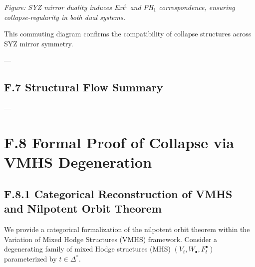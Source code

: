\documentclass[11pt]{article}
\begin{document}
\vspace{0.5em}
\noindent
\begin{minipage}{\textwidth}
\centering
{}
\vspace{0.5em}

\small\textit{Figure: SYZ mirror duality induces Ext$^1$ and PH$_1$ correspondence, ensuring collapse-regularity in both dual systems.}
\end{minipage}

This commuting diagram confirms the compatibility of collapse structures across SYZ mirror symmetry.

---

\subsection*{F.7 Structural Flow Summary}

\begin{center}
\end{center}

---

\section*{F.8 Formal Proof of Collapse via VMHS Degeneration}

\subsection*{F.8.1 Categorical Reconstruction of VMHS and Nilpotent Orbit Theorem}
We provide a categorical formalization of the nilpotent orbit theorem within the Variation of Mixed Hodge Structures (VMHS) framework. Consider a degenerating family of mixed Hodge structures (MHS) \( (V_t, W_\bullet, F^\bullet_t) \) parameterized by \( t \in \Delta^* \).
\end{document}
